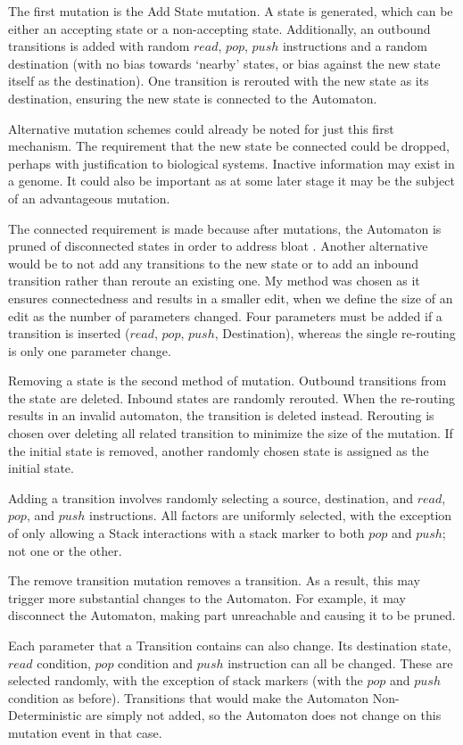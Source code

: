 \documentclass[a4paper,11pt,bcshonoursthesis,singlespace,oneside,thesisdraft,pdflatex]{cssethesis}
\begin{document}
The first mutation is the Add State mutation. A state is generated, which can be either an accepting state or a non-accepting state. Additionally, an outbound transitions is added with random $read$, $pop$, $push$ instructions and a random destination (with no bias towards `nearby' states, or bias against the new state itself as the destination). One transition is rerouted with the new state as its destination, ensuring the new state is connected to the Automaton. 

Alternative mutation schemes could already be noted for just this first mechanism. 
The requirement that the new state be connected could be dropped, perhaps with justification to biological systems. Inactive information may exist in a genome. 
It could also be important as at some later stage it may be the subject of an advantageous mutation. 

The connected requirement is made because after mutations, the Automaton is pruned of disconnected states in order to address bloat \citep[][p 139]{koza}. 
Another alternative would be to not add any transitions to the new state or to add an inbound transition rather than reroute an existing one. My method was chosen as it ensures connectedness and results in a smaller edit, when we define the size of an edit as the number of parameters changed. Four parameters must be added if a transition is inserted ($read$, $pop$, $push$, Destination), whereas the single re-routing is only one parameter change.

Removing a state is the second method of mutation. Outbound transitions from the state are deleted. 
Inbound states are randomly rerouted. When the re-routing results in an invalid automaton, the transition is deleted instead. Rerouting is chosen over deleting all related transition to minimize the size of the mutation. If the initial state is removed, another randomly chosen state is assigned as the initial state.

Adding a transition involves randomly selecting a source, destination, and $read$, $pop$, and $push$ instructions. All factors are uniformly selected, with the exception of only allowing a Stack interactions with a stack marker to both $pop$ and $push$; not one or the other. 

The remove transition mutation removes a transition. As a result, this may trigger more substantial changes to the Automaton. For example, it may disconnect the Automaton, making part unreachable and causing it to be pruned. 

Each parameter that a Transition contains can also change. Its destination state, $read$ condition, $pop$ condition and $push$ instruction can all be changed. These are selected randomly, with the exception of stack markers (with the $pop$ and $push$ condition as before). Transitions that would make the Automaton Non-Deterministic are simply not added, so the Automaton does not change on this mutation event in that case.
\end{document}
